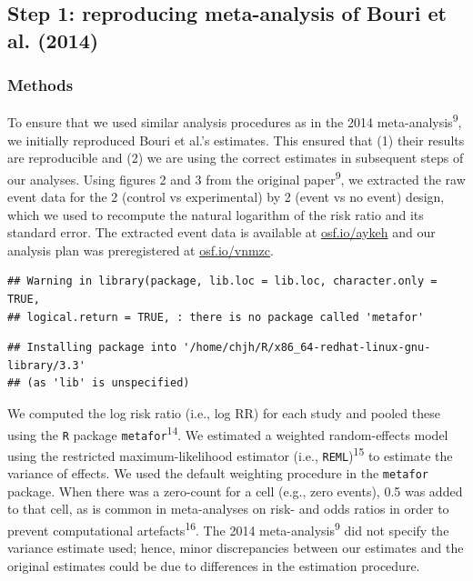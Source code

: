 \documentclass[]{article}
\begin{document}
\subsection{Step 1: reproducing meta-analysis of Bouri et al.
(2014)}\label{step-1-reproducing-meta-analysis-of-bouri-et-al.-2014}

\subsubsection{Methods}\label{methods}

To ensure that we used similar analysis procedures as in the 2014
meta-analysis\textsuperscript{9}, we initially reproduced Bouri et al.'s
estimates. This ensured that (1) their results are reproducible and (2)
we are using the correct estimates in subsequent steps of our analyses.
Using figures 2 and 3 from the original paper\textsuperscript{9}, we
extracted the raw event data for the 2 (control vs experimental) by 2
(event vs no event) design, which we used to recompute the natural
logarithm of the risk ratio and its standard error. The extracted event
data is available at \href{https://osf.io/aykeh}{osf.io/aykeh} and our
analysis plan was preregistered at
\href{https://osf.io/vnmzc}{osf.io/vnmzc}.

\begin{verbatim}
## Warning in library(package, lib.loc = lib.loc, character.only = TRUE,
## logical.return = TRUE, : there is no package called 'metafor'
\end{verbatim}

\begin{verbatim}
## Installing package into '/home/chjh/R/x86_64-redhat-linux-gnu-library/3.3'
## (as 'lib' is unspecified)
\end{verbatim}

We computed the log risk ratio (i.e., log RR) for each study and pooled
these using the \texttt{R} package \texttt{metafor}\textsuperscript{14}.
We estimated a weighted random-effects model using the restricted
maximum-likelihood estimator (i.e., \texttt{REML})\textsuperscript{15}
to estimate the variance of effects. We used the default weighting
procedure in the \texttt{metafor} package. When there was a zero-count
for a cell (e.g., zero events), 0.5 was added to that cell, as is common
in meta-analyses on risk- and odds ratios in order to prevent
computational artefacts\textsuperscript{16}. The 2014
meta-analysis\textsuperscript{9} did not specify the variance estimate
used; hence, minor discrepancies between our estimates and the original
estimates could be due to differences in the estimation procedure.
\end{document}
